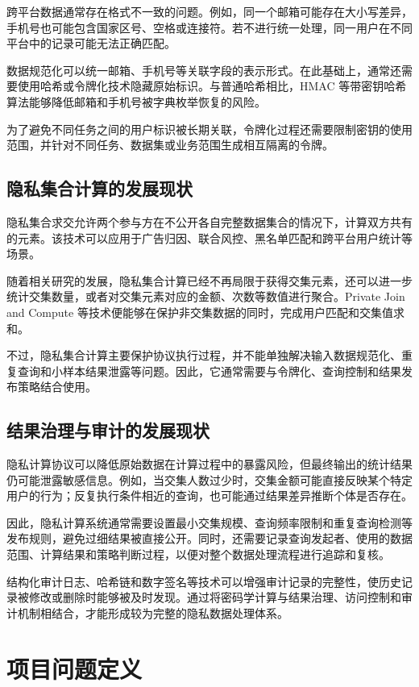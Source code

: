 \documentclass[UTF8,a4paper,12pt,oneside]{ctexrep}
\begin{document}
跨平台数据通常存在格式不一致的问题。例如，同一个邮箱可能存在大小写差异，手机号也可能包含国家区号、空格或连接符。若不进行统一处理，同一用户在不同平台中的记录可能无法正确匹配。

数据规范化可以统一邮箱、手机号等关联字段的表示形式。在此基础上，通常还需要使用哈希或令牌化技术隐藏原始标识。与普通哈希相比，HMAC 等带密钥哈希算法能够降低邮箱和手机号被字典枚举恢复的风险。

为了避免不同任务之间的用户标识被长期关联，令牌化过程还需要限制密钥的使用范围，并针对不同任务、数据集或业务范围生成相互隔离的令牌。

\subsection{隐私集合计算的发展现状}

隐私集合求交允许两个参与方在不公开各自完整数据集合的情况下，计算双方共有的元素。该技术可以应用于广告归因、联合风控、黑名单匹配和跨平台用户统计等场景。

随着相关研究的发展，隐私集合计算已经不再局限于获得交集元素，还可以进一步统计交集数量，或者对交集元素对应的金额、次数等数值进行聚合。Private Join and Compute 等技术便能够在保护非交集数据的同时，完成用户匹配和交集值求和。

不过，隐私集合计算主要保护协议执行过程，并不能单独解决输入数据规范化、重复查询和小样本结果泄露等问题。因此，它通常需要与令牌化、查询控制和结果发布策略结合使用。

\subsection{结果治理与审计的发展现状}

隐私计算协议可以降低原始数据在计算过程中的暴露风险，但最终输出的统计结果仍可能泄露敏感信息。例如，当交集人数过少时，交集金额可能直接反映某个特定用户的行为；反复执行条件相近的查询，也可能通过结果差异推断个体是否存在。

因此，隐私计算系统通常需要设置最小交集规模、查询频率限制和重复查询检测等发布规则，避免过细结果被直接公开。同时，还需要记录查询发起者、使用的数据范围、计算结果和策略判断过程，以便对整个数据处理流程进行追踪和复核。

结构化审计日志、哈希链和数字签名等技术可以增强审计记录的完整性，使历史记录被修改或删除时能够被及时发现。通过将密码学计算与结果治理、访问控制和审计机制相结合，才能形成较为完整的隐私数据处理体系。

\section{项目问题定义}
\end{document}
